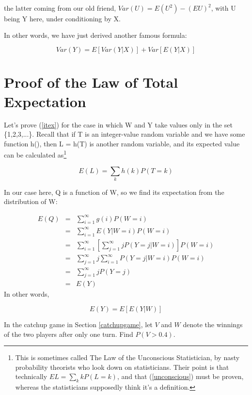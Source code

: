 the latter coming from our old friend, $Var(U) = E(U^2) - (EU)^2$, with
U being Y here, under conditioning by X.

In other words, we have just derived another famous formula:

\begin{equation}
Var(Y) = E[Var(Y|X)] + Var[E(Y|X)]
\end{equation}

\section{Proof of the Law of Total Expectation}
\label{proveitex} 

Let's prove (\ref{itex}) for the case in which W and Y take values only
in the set \{1,2,3,...\}.  Recall that if T is an integer-value random
variable and we have some function h(), then L = h(T) is another random
variable, and its expected value can be calculated as\footnote{This is
sometimes called The Law of the Unconscious Statistician, by nasty
probability theorists who look down on statisticians.  Their point is
that technically $EL = \sum_k k P(L = k)$, and that (\ref{unconscious})
must be proven, whereas the statisticians supposedly think it's a
definition.}  

\begin{equation}
\label{unconscious}
E(L) = \sum_k h(k) P(T = k)
\end{equation}

In our case here, Q is a function of W, so we find its expectation from
the distribution of W:

\begin{eqnarray*}
E(Q) & = & \sum ^{\infty }_{i=1}g(i) P(W=i)\\
 & = & \sum ^{\infty }_{i=1}E(Y|W=i)P(W=i)\\
 & = & \sum ^{\infty }_{i=1} \left [ \sum ^{\infty }_{j=1}jP(Y=j|W=i) \right ] P(W=i) \\
 & = & \sum ^{\infty }_{j=1}j\sum ^{\infty }_{i=1}P(Y=j|W=i)P(W=i)\\
 & = & \sum ^{\infty }_{j=1}jP(Y=j)\\
 & = & E(Y)
\end{eqnarray*}
 In other words, 

\begin{equation}
E(Y)=E[E(Y|W)]
\end{equation}

\startproblemset

\oneproblem
In the catchup game in Section \ref{catchupgame}, let $V$ and $W$ denote
the winnings of the two players after only one turn.  Find $P(V > 0.4)$.

